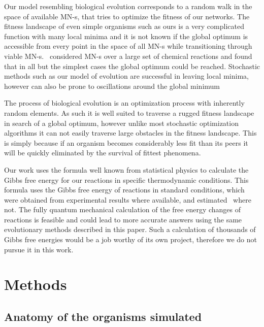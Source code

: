 \documentclass[a4paper,12pt]{article}
\begin{document}
	Our model resembling biological evolution corresponds to a random walk in the space of available MN-s, that tries to optimize the fitness of our networks. The fitness landscape of even simple organisms such as ours is a very complicated function with many local minima and it is not known if the global optimum is accessible from every point in the space of all MN-s while transitioning through viable MN-s. \cite{historical}~considered MN-s over a large set of chemical reactions and found that in all but the simplest cases the global optimum could be reached. Stochastic methods such as our model of evolution are successful in leaving local minima, however can also be prone to oscillations around the global minimum 

	The process of biological evolution is an optimization process with inherently random elements. As such it is well suited to traverse a rugged fitness landscape in search of a global optimum, however unlike most stochastic optimization algorithms it can not easily traverse large obstacles in the fitness landscape. This is simply because if an organism becomes considerably less fit than its peers it will be quickly eliminated by the survival of fittest phenomena.

	Our work uses the formula well known from statistical physics to calculate the Gibbs free energy for our reactions in specific thermodynamic conditions. This formula uses the Gibbs free energy of reactions in standard conditions, which were obtained from experimental results where available, and estimated \cite{BartekLower}~where not. The fully quantum mechanical calculation of the free energy changes of reactions is feasible and could lead to more accurate answers using the same evolutionary methods described in this paper. Such a calculation of thousands of Gibbs free energies would be a job worthy of its own project, therefore we do not pursue it in this work. 

	
\section{Methods}
\label{sec:methods}



	\subsection{Anatomy of the organisms simulated}
	\label{ssub:anatomy_of_the_oganisms_simulated}
\end{document}
